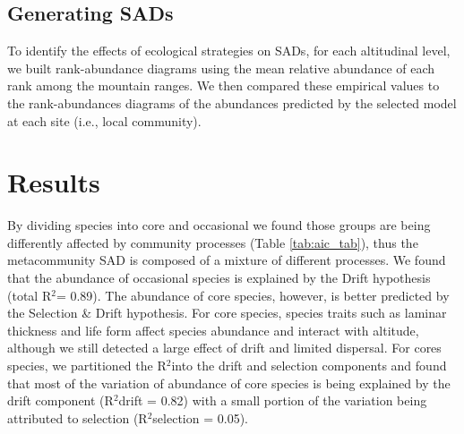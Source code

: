 \documentclass[12pt]{article}
\renewcommand{\Rsquared}{R{$^2$}}
\begin{document}
\subsection*{Generating SADs}

To identify the effects of ecological strategies on SADs, for each altitudinal level, we built rank-abundance diagrams using the mean relative abundance of each rank among the mountain ranges. We then compared these empirical
values to the rank-abundances diagrams of the abundances predicted by the selected model at each site (i.e., local community). 

\section*{Results}


By dividing species into core and occasional we found those groups are being differently affected by community processes (Table \ref{tab:aic_tab}), thus the metacommunity SAD is composed of a mixture of different processes. We found that the abundance of occasional species is explained by the Drift hypothesis (total \Rsquared = 0.89). The abundance of core species, however, is better
predicted
by the Selection \& Drift hypothesis. For core species, species traits such as laminar thickness and life form affect species abundance and interact with altitude, although we still detected a large effect of drift and limited dispersal. For cores species, we partitioned the \Rsquared into the drift and selection components and found that most of the variation of abundance of core species is being explained by the drift component (\Rsquared drift = 0.82) with a small portion of the variation  being attributed to selection (\Rsquared selection = 0.05). 
\end{document}
